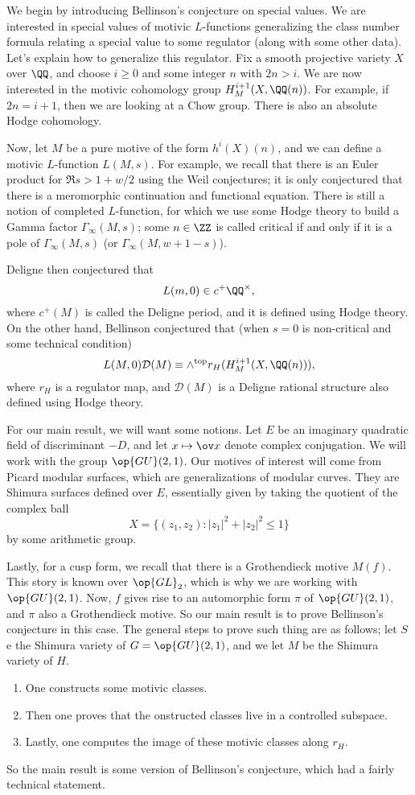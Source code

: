 \documentclass{article}
\begin{document}
We begin by introducing Bellinson's conjecture on special values. We are interested in special values of motivic $L$-functions generalizing the class number formula relating a special value to some regulator (along with some other data). Let's explain how to generalize this regulator. Fix a smooth projective variety $X$ over $\QQ$, and choose $i\ge0$ and some integer $n$ with $2n>i$.
We are now interested in the motivic cohomology group $H^{i+1}_M(X,\QQ(n))$. For example, if $2n=i+1$, then we are looking at a Chow group. There is also an absolute Hodge cohomology.

Now, let $M$ be a pure motive of the form $h^i(X)(n)$, and we can define a motivic $L$-function $L(M,s)$. For example, we recall that there is an Euler product for $\Re s>1+w/2$ using the Weil conjectures; it is only conjectured that there is a meromorphic continuation and functional equation. There is still a notion of completed $L$-function, for which we use some Hodge theory to build a Gamma factor $\Gamma_\infty(M,s)$; some $n\in\ZZ$ is called critical if and only if it is a pole of $\Gamma_\infty(M,s)$ (or $\Gamma_\infty(M,w+1-s)$).

Deligne then conjectured that
\[L(m,0)\in c^+\QQ^\times,\]
where $c^+(M)$ is called the Deligne period, and it is defined using Hodge theory. On the other hand, Bellinson conjectured that (when $s=0$ is non-critical and some technical condition)
\[L(M,0)\mathcal D(M)\equiv\land^{\mathrm{top}}r_H(H_M^{i+1}(X,\QQ(n))),\]
where $r_H$ is a regulator map, and $\mathcal D(M)$ is a Deligne rational structure also defined using Hodge theory.

For our main result, we will want some notions. Let $E$ be an imaginary quadratic field of discriminant $-D$, and let $x\mapsto\ov x$ denote complex conjugation. We will work with the group $\op{GU}(2,1)$. Our motives of interest will come from Picard modular surfaces, which are generalizations of modular curves. They are Shimura surfaces defined over $E$, essentially given by taking the quotient of the complex ball
\[X=\{(z_1,z_2):\left|z_1\right|^2+\left|z_2\right|^2\le1\}\]
by some arithmetic group.

Lastly, for a cusp form, we recall that there is a Grothendieck motive $M(f)$. This story is known over $\op{GL}_2$, which is why we are working with $\op{GU}(2,1)$. Now, $f$ gives rise to an automorphic form $\pi$ of $\op{GU}(2,1)$, and $\pi$ also a Grothendieck motive. So our main result is to prove Bellinson's conjecture in this case. The general steps to prove such thing are as follows; let $S$ e the Shimura variety of $G=\op{GU}(2,1)$, and we let $M$ be the Shimura variety of $H$.
\begin{enumerate}
	\item One constructs some motivic classes.
	\item Then one proves that the onstructed classes live in a controlled subspace.
	\item Lastly, one computes the image of these motivic classes along $r_H$.
\end{enumerate}
So the main result is some version of Bellinson's conjecture, which had a fairly technical statement.
\end{document}

